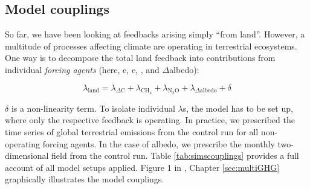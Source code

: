 \subsection{Model couplings}
\label{sec:couplings}
So far, we have been looking at feedbacks arising simply ``from land''. However, a multitude of processes affecting climate are operating in terrestrial ecosystems. One way is to decompose the total land feedback into contributions from individual {\it forcing agents} (here, e\nno , e\chh , \dc , and $\Delta$albedo):

\begin{equation}
  \lambda_{\text{land}} = \lambda_{\Delta\text{C}} + \lambda_{\text{CH}_4} + \lambda_{\text{N}_2\text{O}} + \lambda_{\Delta\text{albedo}} + \delta
\end{equation}

$\delta$ is a non-linearity term. To isolate individual $\lambda$s, the model has to be set up, where only the respective feedback is operating. In practice, we prescribed the time series of global terrestrial emissions from the control run for all non-operating forcing agents. In the case of albedo, we prescribe the monthly two-dimensional field from the control run. Table \ref{tab:simscouplings} provides a full account of all model setups applied. Figure 1 in \citet{stocker13natcc}, Chapter \ref{sec:multiGHG} graphically illustrates the model couplings.\\

